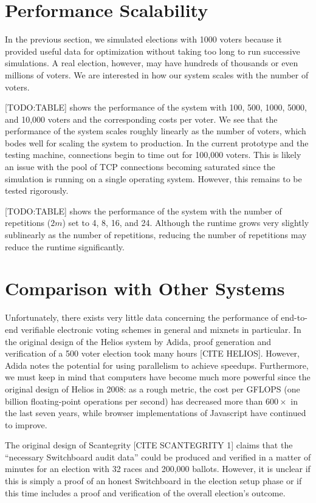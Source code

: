 \section{Performance Scalability}

In the previous section, we simulated elections with 1000 voters because it provided useful data for optimization without taking too long to run successive simulations. A real election, however, may have hundreds of thousands or even millions of voters. We are interested in how our system scales with the number of voters.

[TODO:TABLE] shows the performance of the system with 100, 500, 1000, 5000, and 10,000 voters and the corresponding costs per voter. We see that the performance of the system scales roughly linearly as the number of voters, which bodes well for scaling the system to production. In the current prototype and the testing machine, connections begin to time out for 100,000 voters. This is likely an issue with the pool of TCP connections becoming saturated since the simulation is running on a single operating system. However, this remains to be tested rigorously.

[TODO:TABLE] shows the performance of the system with the number of repetitions ($2m$) set to 4, 8, 16, and 24. Although the runtime grows very slightly sublinearly as the number of repetitions, reducing the number of repetitions may reduce the runtime significantly.

\section{Comparison with Other Systems}

Unfortunately, there exists very little data concerning the performance of end-to-end verifiable electronic voting schemes in general and mixnets in particular. In the original design of the Helios system by Adida, proof generation and verification of a 500 voter election took many hours [CITE HELIOS]. However, Adida notes the potential for using parallelism to achieve speedups. Furthermore, we must keep in mind that computers have become much more powerful since the original design of Helios in 2008: as a rough metric, the cost per GFLOPS (one billion floating-point operations per second) has decreased more than $600 \times$ in the last seven years, while browser implementations of Javascript have continued to improve.

The original design of Scantegrity [CITE SCANTEGRITY 1] claims that the ``necessary Switchboard audit data'' could be produced and verified in a matter of minutes for an election with 32 races and 200,000 ballots. However, it is unclear if this is simply a proof of an honest Switchboard in the election setup phase or if this time includes a proof and verification of the overall election's outcome.

